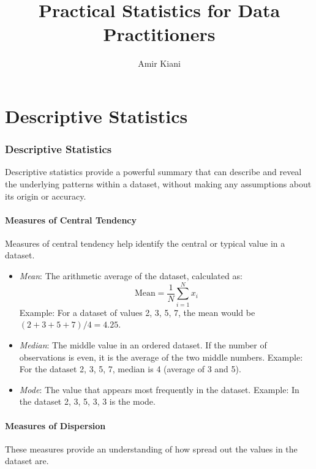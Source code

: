\documentclass{article}
\title{Practical Statistics for Data Practitioners}
\author{Amir Kiani}
\date{}
\theoremstyle{definition}
\theoremstyle{theorem}
\theoremstyle{theorem}
\theoremstyle{theorem}
\theoremstyle{theorem}
\theoremstyle{definition}
\theoremstyle{definition}
\theoremstyle{definition}
\theoremstyle{definition}
\theoremstyle{definition}
\begin{document}
\maketitle

\tableofcontents
\newpage

\part{Descriptive Statistics}

\section{Descriptive Statistics}

Descriptive statistics provide a powerful summary that can describe and reveal the underlying patterns within a dataset, without making any assumptions about its origin or accuracy.

\subsection{Measures of Central Tendency}

Measures of central tendency help identify the central or typical value in a dataset.

\begin{itemize}
    \item \textit{Mean}: The arithmetic average of the dataset, calculated as:
    \[
    \text{Mean} = \frac{1}{N} \sum_{i=1}^{N} x_i
    \]
    Example: For a dataset of values 2, 3, 5, 7, the mean would be \((2+3+5+7)/4 = 4.25\).

    \item \textit{Median}: The middle value in an ordered dataset. If the number of observations is even, it is the average of the two middle numbers.
    Example: For the dataset 2, 3, 5, 7, median is 4 (average of 3 and 5).

    \item \textit{Mode}: The value that appears most frequently in the dataset.
    Example: In the dataset 2, 3, 5, 3, 3 is the mode.
\end{itemize}

\subsection{Measures of Dispersion}

These measures provide an understanding of how spread out the values in the dataset are.
\end{document}
